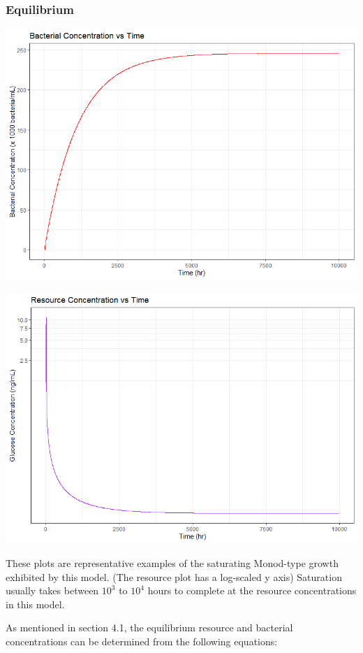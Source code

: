 \documentclass{article}
\begin{document}
\subsubsection{Equilibrium}
\begin{center}
\includegraphics[scale=0.5]{plots/NoPhage_U.png}

\includegraphics[scale=0.5]{plots/NoPhage_R.png}

\end{center}

These plots are representative examples of the saturating Monod-type growth exhibited by this model. (The resource plot has a log-scaled y axis) Saturation usually takes between $10^3$ to $10^4$ hours to complete at the resource concentrations in this model. 

As mentioned in section 4.1, the equilibrium resource and bacterial concentrations can be determined from the following equations:
\end{document}
